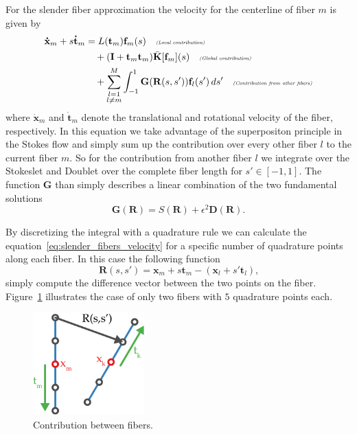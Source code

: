 \documentclass[a4paper,11pt]{kth-mag}
\begin{document}
For the slender fiber approximation the velocity for the centerline of fiber $m$ is given by
\begin{equation}
  \label{eq:slender_fibers_velocity}
  \begin{aligned}
    \mathbf{\dot{x}}_m + s \mathbf{\dot{t}}_m &= L(\mathbf{t}_m) \mathbf{f}_m(s) \quad \textit{\tiny{(Local contribution)}} \\
     &\quad + (\mathbf{I} + \mathbf{t}_m \mathbf{t}_m)\bar{\mathbf{K}}[\mathbf{f}_m](s) \quad \textit{\tiny{(Global contribution)}} \\
     &\quad + \sum_{\substack{l = 1\\l \neq m}}^M \int_{-1}^{1}\mathbf{G}(\mathbf{R}(s,s'))\mathbf{f}_l(s') \,ds' \quad \textit{\tiny{(Contribution from other fibers)}} \\
  \end{aligned}
\end{equation}
where $\mathbf{\dot{x}}_m$ and $\mathbf{\dot{t}}_m$ denote the translational and rotational velocity of the fiber, respectively. In this equation we take advantage of the superpositon principle in the Stokes flow and simply sum up the contribution over every other fiber $l$ to the current fiber $m$. So for the contribution from another fiber $l$ we integrate over the Stokeslet and Doublet over the complete fiber length for $s' \in [-1, 1]$. The function $\mathbf{G}$ than simply describes a linear combination of the two fundamental solutions
\begin{equation}
  \label{eq:G}
  \mathbf{G}(\mathbf{R}) = S(\mathbf{R}) + \epsilon^2 \mathbf{D}(\mathbf{R}) \text{.}
\end{equation}

By discretizing the integral with a quadrature rule we can calculate the equation~\eqref{eq:slender_fibers_velocity} for a specific number of quadrature points along each fiber. In this case the following function
\begin{equation}
  \label{eq:fiber_distance}
  \mathbf{R}(s, s') = \mathbf{x}_m + s \mathbf{t}_m - (\mathbf{x}_l + s'\mathbf{t}_l) \text{,}
\end{equation}
simply compute the difference vector between the two points on the fiber. Figure~\ref{fig:fiber_contribution} illustrates the case of only two fibers with $5$ quadrature points each.
\begin{figure}[!htbp]
  \centering
  \includegraphics[width=0.3819660112501450000000\textwidth]{img/fiber_contribution.pdf}
  \caption{Contribution between fibers.}
  \label{fig:fiber_contribution}
\end{figure}
\end{document}
